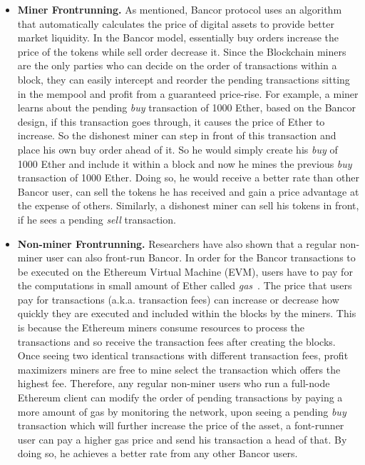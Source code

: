 

\begin{itemize}
\item {\textbf{Miner Frontrunning.}} As mentioned, Bancor protocol uses an algorithm that automatically calculates the price of digital assets to provide better market liquidity. In the Bancor model, essentially buy orders increase the price of the tokens while sell order decrease it. Since the Blockchain miners are the only parties who can decide on the order of transactions within a block, they can easily intercept and reorder the pending transactions sitting in the mempool and profit from a guaranteed price-rise. For example, a miner learns about the pending \textit{buy} transaction of 1000 Ether, based on the Bancor design, if this transaction goes through, it causes the price of Ether to increase. So the dishonest miner can step in front of this transaction and  place his own buy order ahead of it. So he would simply create his \textit{buy} of 1000 Ether and include it within a block and now he mines the previous \textit{buy} transaction of 1000 Ether. Doing so, he would receive a better rate than other Bancor user, can sell the tokens he has received and gain a price advantage at the expense of others. Similarly, a dishonest miner can sell his tokens in front, if he sees a pending \textit{sell} transaction.


\item {\textbf{Non-miner Frontrunning.}} Researchers have also shown that a regular non-miner user can also front-run Bancor. In order for the Bancor transactions to be executed on the Ethereum Virtual Machine (EVM),  users have to pay for the computations in small amount of Ether called \textit{gas}~\cite{AccountT67:online}. The price that users pay for transactions (a.k.a. transaction fees) can increase or decrease how quickly they are executed and included within the blocks by the miners.  This is because the Ethereum miners consume resources to process the transactions and so receive the transaction fees after creating the blocks. Once seeing two identical transactions with different transaction fees, profit maximizers miners are free to mine select the transaction which offers the highest fee. Therefore, any regular non-miner users who run a full-node Ethereum client can modify the order of pending transactions by paying a more amount of gas \ie by monitoring the network, upon seeing a  pending \textit{buy} transaction which will further increase the price of the asset, a font-runner user can pay a higher gas price and send his transaction a head of that. By doing so, he achieves a better rate from any other Bancor users.

\end{itemize}



